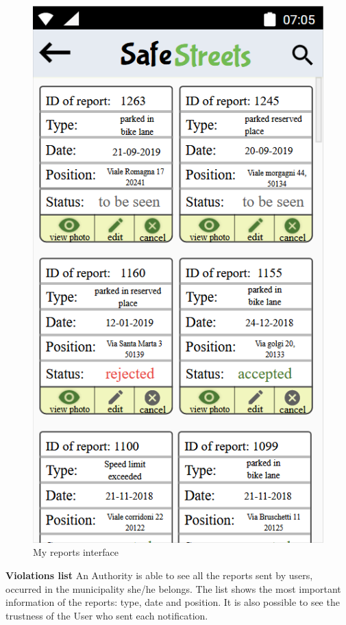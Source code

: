     \vspace{5mm}
    \begin{figure}[h]
        \centering
        \includegraphics[scale=0.8]{Images/my_reports.png}
        \caption{My reports interface}
    \end{figure}
    \vspace{4mm}
   
      \newpage
    \noindent\textbf{Violations list}\newline
    An Authority is able to see all the reports sent by users, occurred in the municipality she/he belongs. The list shows the most important information of the reports: type, date and position. It is also possible to see the trustness of the User who sent each notification.\newline
    
